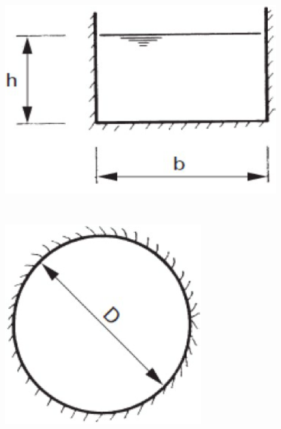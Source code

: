 \begin{minipage}[c]{0.48\columnwidth}
    \\
    \begin{center}
        \includegraphics[width=0.9\textwidth, align=c]{images/Hydraulischer_Radius_Rechteck.png}
    \end{center}
\end{minipage}
\hfill
\vrule width 1pt %
\hfill
\begin{minipage}[c]{0.48\columnwidth}
    \\
    \begin{center}
        \includegraphics[width=0.65\textwidth, align=c]{images/Hydraulischer_Radius_Kreis.png}
    \end{center}
\end{minipage}

\vspace{0.25cm}


